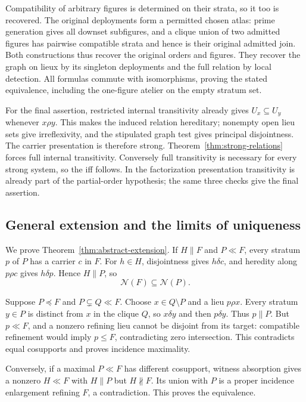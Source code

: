Compatibility of arbitrary figures is determined on their
strata, so it too is recovered. The original deployments
form a permitted chosen atlas: prime generation gives all
downset subfigures, and a clique union of two admitted figures
has pairwise compatible strata and hence is their original
admitted join. Both constructions thus recover the original
orders and figures. They recover the graph on lieux by its
singleton deployments and the full relation by local detection.
All formulas commute with isomorphisms, proving the stated
equivalence, including the one-figure atelier on the empty
stratum set.

For the final assertion, restricted internal transitivity
already gives $U_x\subseteq U_y$ whenever $x\rho y$.
This makes the induced relation hereditary; nonempty open
lieu sets give irreflexivity, and the stipulated graph test
gives principal disjointness. The carrier presentation is
therefore strong. Theorem~\ref{thm:strong-relations} forces
full internal transitivity. Conversely full transitivity is
necessary for every strong system, so the iff follows.
In the factorization presentation transitivity is already
part of the partial-order hypothesis; the same three checks
give the final assertion.

\subsection{General extension and the limits of uniqueness}
We prove Theorem~\ref{thm:abstract-extension}.
If $H\parallel F$ and $P\ll F$, every stratum $p$ of $P$
has a carrier $c$ in $F$. For $h\in H$, disjointness gives
$h\delta c$, and heredity along $p\rho c$ gives
$h\delta p$. Hence $H\parallel P$, so
\[
 \mathcal N(F)\subseteq\mathcal N(P).
\]

Suppose $P\preceq F$ and $P\subsetneq Q\ll F$.
Choose $x\in Q\setminus P$ and a lieu $p\rho x$.
Every stratum $y\in P$ is distinct from $x$ in the clique $Q$,
so $x\delta y$ and then $p\delta y$. Thus $p\parallel P$.
But $p\ll F$, and a nonzero refining lieu cannot be disjoint
from its target: compatible refinement would imply $p\leq F$,
contradicting zero intersection. This contradicts equal cosupports
and proves incidence maximality.

Conversely, if a maximal $P\ll F$ has different cosupport,
witness absorption gives a nonzero $H\ll F$ with
$H\parallel P$ but $H\not\parallel F$.
Its union with $P$ is a proper incidence enlargement refining
$F$, a contradiction. This proves the equivalence.

